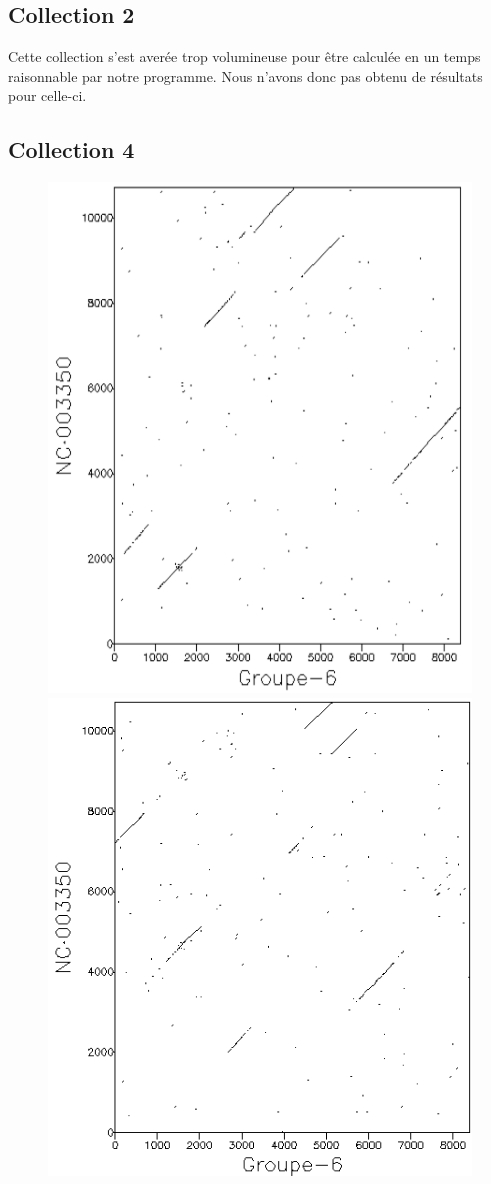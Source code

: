 \documentclass[11pt]{article}
\begin{document}
\subsection*{Collection 2}
Cette collection s'est averée trop volumineuse pour être calculée en un temps raisonnable par notre programme. Nous n'avons donc pas obtenu de résultats pour celle-ci.
\subsection*{Collection 4}
\begin{figure}[H]
\centering
\includegraphics[scale=.55]{11200.png}
\includegraphics[scale=.55]{11200ic.png}

\end{figure}
\end{document}

